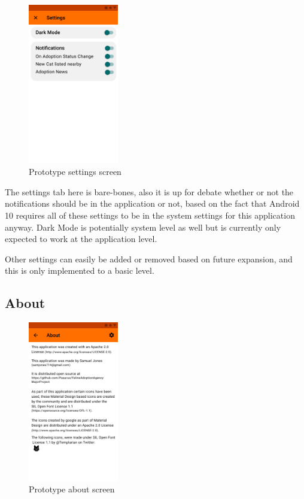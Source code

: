 \begin{figure} [htbp!]
    \centering
    \includegraphics[height=7cm]{Images/PrototypeSettings.png}
    \caption{Prototype settings screen}
    \label{fig:prototype_settings_screen}
\end{figure}

The settings tab here is bare-bones, also it is up for debate whether or not the notifications should be in the application or not, based on the fact that Android 10 requires all of these settings to be in the system settings for this application anyway. Dark Mode is potentially system level as well but is currently only expected to work at the application level. 

Other settings can easily be added or removed based on future expansion, and this is only implemented to a basic level.

\subsection{About}

\begin{figure} [htbp!]
    \centering
    \includegraphics[height=7cm]{Images/PrototypeAbout.png}
    \caption{Prototype about screen}
    \label{fig:prototype_about_screen}
\end{figure}


